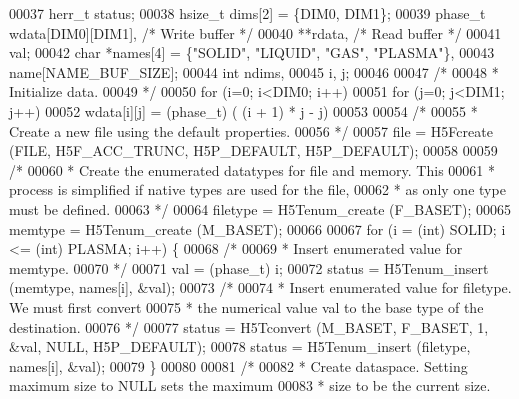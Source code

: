 \begin{DoxyCode}
00037     herr\_t      status;
00038     hsize\_t     dims[2] = \{DIM0, DIM1\};
00039     phase\_t     wdata[DIM0][DIM1],          \textcolor{comment}{/* Write buffer */}
00040                 **rdata,                    \textcolor{comment}{/* Read buffer */}
00041                 val;
00042     \textcolor{keywordtype}{char}        *names[4] = \{\textcolor{stringliteral}{"SOLID"}, \textcolor{stringliteral}{"LIQUID"}, \textcolor{stringliteral}{"GAS"}, \textcolor{stringliteral}{"PLASMA"}\},
00043                 name[NAME\_BUF\_SIZE];
00044     \textcolor{keywordtype}{int}         ndims,
00045                 i, j;
00046 
00047     \textcolor{comment}{/*}
00048 \textcolor{comment}{     * Initialize data.}
00049 \textcolor{comment}{     */}
00050     \textcolor{keywordflow}{for} (i=0; i<DIM0; i++)
00051         \textcolor{keywordflow}{for} (j=0; j<DIM1; j++)
00052             wdata[i][j] = (phase\_t) ( (i + 1) * j - j) %
00053 
00054     \textcolor{comment}{/*}
00055 \textcolor{comment}{     * Create a new file using the default properties.}
00056 \textcolor{comment}{     */}
00057     file = H5Fcreate (FILE, H5F\_ACC\_TRUNC, H5P\_DEFAULT, H5P\_DEFAULT);
00058 
00059     \textcolor{comment}{/*}
00060 \textcolor{comment}{     * Create the enumerated datatypes for file and memory.  This}
00061 \textcolor{comment}{     * process is simplified if native types are used for the file,}
00062 \textcolor{comment}{     * as only one type must be defined.}
00063 \textcolor{comment}{     */}
00064     filetype = H5Tenum\_create (F\_BASET);
00065     memtype = H5Tenum\_create (M\_BASET);
00066 
00067     \textcolor{keywordflow}{for} (i = (\textcolor{keywordtype}{int}) SOLID; i <= (int) PLASMA; i++) \{
00068         \textcolor{comment}{/*}
00069 \textcolor{comment}{         * Insert enumerated value for memtype.}
00070 \textcolor{comment}{         */}
00071         val = (phase\_t) i;
00072         status = H5Tenum\_insert (memtype, names[i], &val);
00073         \textcolor{comment}{/*}
00074 \textcolor{comment}{         * Insert enumerated value for filetype.  We must first convert}
00075 \textcolor{comment}{         * the numerical value val to the base type of the destination.}
00076 \textcolor{comment}{         */}
00077         status = H5Tconvert (M\_BASET, F\_BASET, 1, &val, NULL, H5P\_DEFAULT);
00078         status = H5Tenum\_insert (filetype, names[i], &val);
00079     \}
00080 
00081     \textcolor{comment}{/*}
00082 \textcolor{comment}{     * Create dataspace.  Setting maximum size to NULL sets the maximum}
00083 \textcolor{comment}{     * size to be the current size.}

\end{DoxyCode}
